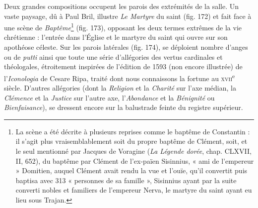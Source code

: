 \documentclass[12pt,twoside,openany]{book}
\begin{document}
Deux grandes compositions occupent les parois des extrémités de la salle. Un vaste paysage, dû à Paul Bril, illustre \textit{Le Martyre} du saint (fig. 172) et fait face à une scène de \textit{Baptême}\footnote{La scène a été décrite à plusieurs reprises comme le baptême de Constantin : il s’agit plus vraisemblablement soit du propre baptême de Clément, soit, et le seul mentionné par Jacques de Voragine (\textit{La Légende dorée}, chap. CLXVII, II, 652), du baptême par Clément de l’ex-païen Sisinnius, « ami de l’empereur » Domitien, auquel Clément avait rendu la vue et l’ouïe, qu’il convertit puis baptisa avec 313 « personnes de sa famille », Sisinnius ayant par la suite converti nobles et familiers de l’empereur Nerva, le martyre du saint ayant eu lieu sous Trajan.} (fig. 173), opposant les deux termes extrêmes de la vie chrétienne : l’entrée dans l’Église et le martyre du saint qui ouvre sur son apothéose céleste. Sur les parois latérales (fig. 174), se déploient nombre d’anges ou de \textit{putti} ainsi que toute une série d’allégories des vertus cardinales et théologales, étroitement inspirées de l’édition de 1593 (non encore illustrée) de l’\textit{Iconologia} de Cesare Ripa, traité dont nous connaissons la fortune au \textsc{xvii}\textsuperscript{e} siècle. D’autres allégories (dont la \textit{Religion} et la \textit{Charité} sur l’axe médian, la \textit{Clémence} et la \textit{Justice} sur l’autre axe, l’\textit{Abondance} et la \textit{Bénignité} ou \textit{Bienfaisance}), se dressent encore sur la balustrade feinte du registre supérieur.
\end{document}

